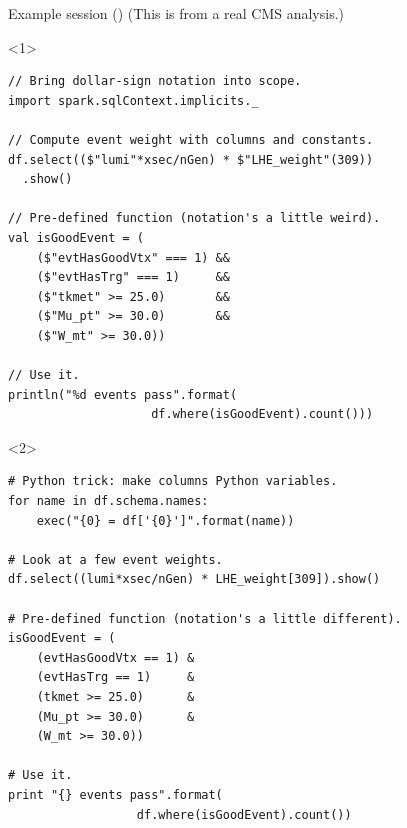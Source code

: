 \documentclass{beamer}
\begin{document}
\begin{frame}[fragile]{Example session ()}
\vspace{0.25 cm}
(This is from a real CMS analysis.)

\begin{onlyenv}<1>
\small
\begin{verbatim}
// Bring dollar-sign notation into scope.
import spark.sqlContext.implicits._

// Compute event weight with columns and constants.
df.select(($"lumi"*xsec/nGen) * $"LHE_weight"(309))
  .show()

// Pre-defined function (notation's a little weird).
val isGoodEvent = (
    ($"evtHasGoodVtx" === 1) &&
    ($"evtHasTrg" === 1)     &&
    ($"tkmet" >= 25.0)       &&
    ($"Mu_pt" >= 30.0)       &&
    ($"W_mt" >= 30.0))

// Use it.
println("%d events pass".format(
                    df.where(isGoodEvent).count()))
\end{verbatim}
\end{onlyenv}

\begin{onlyenv}<2>
\small
\begin{verbatim}
# Python trick: make columns Python variables.
for name in df.schema.names:
    exec("{0} = df['{0}']".format(name))

# Look at a few event weights.
df.select((lumi*xsec/nGen) * LHE_weight[309]).show()

# Pre-defined function (notation's a little different).
isGoodEvent = (
    (evtHasGoodVtx == 1) &
    (evtHasTrg == 1)     &
    (tkmet >= 25.0)      &
    (Mu_pt >= 30.0)      &
    (W_mt >= 30.0))

# Use it.
print "{} events pass".format(
                  df.where(isGoodEvent).count())
\end{verbatim}
\end{onlyenv}
\end{frame}
\end{document}
